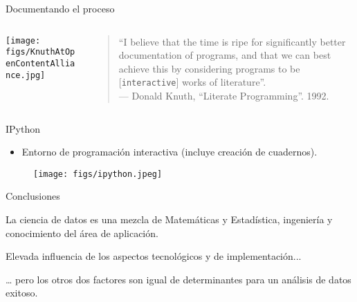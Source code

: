 
\begin{frame}{Documentando el proceso}
 \begin{columns}[T]
    \begin{column}{.5\textwidth}
    \texttt{[image: figs/KnuthAtOpenContentAlliance.jpg]}
    \end{column}
    \begin{column}{.5\textwidth}
    \vspace*{1cm}
    \begin{quotation}
     ``I believe that the time is   ripe for significantly better documentation 
     of programs, and that we can best achieve this by considering programs 
     to be [\texttt{interactive}] works of literature''.\\
     — Donald Knuth, ``Literate Programming''. 1992.
    \end{quotation}

    \end{column}
  \end{columns}

\end{frame}


\begin{frame}{IPython}
\begin{itemize}
 \item Entorno de programación interactiva (incluye creación de cuadernos).
\end{itemize}

\begin{figure}
 \centering
 \texttt{[image: figs/ipython.jpeg]}
\end{figure}

\end{frame}


\begin{frame}{Conclusiones}
 \begin{wideitemize}
  \item La ciencia de datos es una mezcla de Matemáticas y Estadística, 
  ingeniería y conocimiento del área de aplicación.
  \item Elevada influencia de los aspectos tecnológicos y de implementación...
  \item … pero los otros dos factores son igual de determinantes para un 
  análisis de datos exitoso. 

 \end{wideitemize}

\end{frame}

